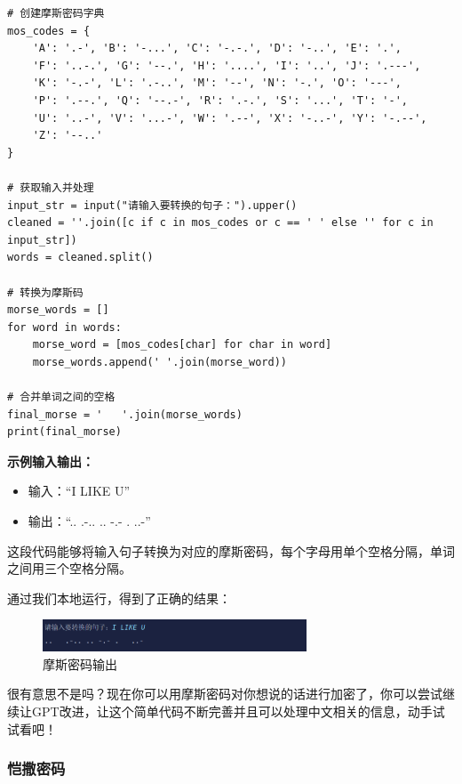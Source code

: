 \begin{lstlisting}
# 创建摩斯密码字典
mos_codes = {
    'A': '.-', 'B': '-...', 'C': '-.-.', 'D': '-..', 'E': '.', 
    'F': '..-.', 'G': '--.', 'H': '....', 'I': '..', 'J': '.---', 
    'K': '-.-', 'L': '.-..', 'M': '--', 'N': '-.', 'O': '---', 
    'P': '.--.', 'Q': '--.-', 'R': '.-.', 'S': '...', 'T': '-', 
    'U': '..-', 'V': '...-', 'W': '.--', 'X': '-..-', 'Y': '-.--', 
    'Z': '--..'
}

# 获取输入并处理
input_str = input("请输入要转换的句子：").upper()
cleaned = ''.join([c if c in mos_codes or c == ' ' else '' for c in input_str])
words = cleaned.split()

# 转换为摩斯码
morse_words = []
for word in words:
    morse_word = [mos_codes[char] for char in word]
    morse_words.append(' '.join(morse_word))

# 合并单词之间的空格
final_morse = '   '.join(morse_words)
print(final_morse)
\end{lstlisting}

\textbf{示例输入输出：}

\begin{itemize}
\item
  输入：``I LIKE U''
\item
  输出：``.. .-.. .. -.- . ..-''
\end{itemize}

这段代码能够将输入句子转换为对应的摩斯密码，每个字母用单个空格分隔，单词之间用三个空格分隔。

通过我们本地运行，得到了正确的结果：

\centering
\begin{figure}[H] %
    \centering %
    \includegraphics[width=0.7\textwidth]{sections/images/image-20250210171257118.png} %
    \caption{摩斯密码输出} %
    \label{Fig.main1} %
\end{figure}%

很有意思不是吗？现在你可以用摩斯密码对你想说的话进行加密了，你可以尝试继续让GPT改进，让这个简单代码不断完善并且可以处理中文相关的信息，动手试试看吧！

\hypertarget{ux607aux6492ux5bc6ux7801}{%
\subsubsection{恺撒密码}\label{ux607aux6492ux5bc6ux7801}}

